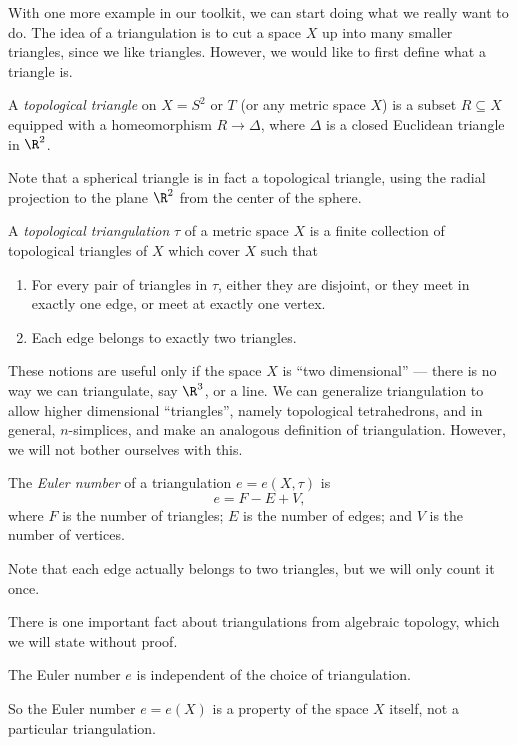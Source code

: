 \documentclass[a4paper]{article}
\begin{document}
With one more example in our toolkit, we can start doing what we really want to do. The idea of a triangulation is to cut a space $X$ up into many smaller triangles, since we like triangles. However, we would like to first define what a triangle is.
\begin{defi}
  A \emph{topological triangle} on $X = S^2$ or $T$ (or any metric space $X$) is a subset $R \subseteq X$ equipped with a homeomorphism $R \to \Delta$, where $\Delta$ is a closed Euclidean triangle in $\R^2$.
\end{defi}
Note that a spherical triangle is in fact a topological triangle, using the radial projection to the plane $\R^2$ from the center of the sphere.
\begin{defi}
  A \emph{topological triangulation} $\tau$ of a metric space $X$ is a finite collection of topological triangles of $X$ which cover $X$ such that
  \begin{enumerate}
    \item For every pair of triangles in $\tau$, either they are disjoint, or they meet in exactly one edge, or meet at exactly one vertex.
    \item Each edge belongs to exactly two triangles.
  \end{enumerate}
\end{defi}
These notions are useful only if the space $X$ is ``two dimensional'' --- there is no way we can triangulate, say $\R^3$, or a line. We can generalize triangulation to allow higher dimensional ``triangles'', namely topological tetrahedrons, and in general, $n$-simplices, and make an analogous definition of triangulation. However, we will not bother ourselves with this.

\begin{defi}
  The \emph{Euler number} of a triangulation $e = e(X, \tau)$ is
  \[
    e = F - E + V,
  \]
  where $F$ is the number of triangles; $E$ is the number of edges; and $V$ is the number of vertices.
\end{defi}
Note that each edge actually belongs to two triangles, but we will only count it once.

There is one important fact about triangulations from algebraic topology, which we will state without proof.
\begin{thm}
  The Euler number $e$ is independent of the choice of triangulation.
\end{thm}
So the Euler number $e = e(X)$ is a property of the space $X$ itself, not a particular triangulation.
\end{document}
